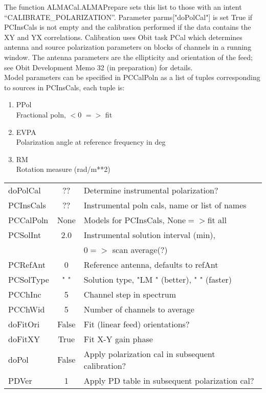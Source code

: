 \documentclass[11pt]{article}
\begin{document}
\begin{enumerate}
The function ALMACal.ALMAPrepare sets this list to those with an
intent ``CALIBRATE\_POLARIZATION''.
Parameter parms["doPolCal"] is set True if PCInsCals is not empty and
the calibration performed if the data contains the XY and YX
correlations. 
Calibration uses Obit task PCal which determines antenna and source
polarization parameters on blocks of channels in a running window.
The antenna parameters are the ellipticity and orientation of the
feed; see Obit Development Memo 32 (in preparation) for details.\\
Model parameters can be specified in PCCalPoln as a list of tuples
corresponding to sources in PCInsCals, each tuple is:
\begin{enumerate}
\item PPol\\
Fractional poln, $<$0 $=>$ fit
\item EVPA\\
Polarization angle at reference frequency in deg
\item RM\\
 Rotation measure (rad/m**2)
\end{enumerate}
\begin{center}
\begin{tabular}{|l|c|l|}
\hline
doPolCal  & ??     &  Determine instrumental polarization? \\
PCInsCals & ??     &  Instrumental poln cals, name or list of names\\
PCCalPoln &  None  &  Models for PCInsCals, None$=>$fit all \\
PCSolInt  & 2.0    &  Instrumental solution interval (min), \\
          &        & $0=>$ scan average(?) \\
PCRefAnt  & 0      &  Reference antenna, defaults to refAnt\\
PCSolType & "    " &  Solution type, "LM  " (better), "    " (faster)\\
PCChInc   & 5      &  Channel step in spectrum \\
PCChWid   & 5      &  Number of channels to average \\
doFitOri  &  False &  Fit (linear feed) orientations? \\
doFitXY   &  True  &  Fit X-Y gain phase\\
doPol     & False  &  Apply polarization cal in subsequent calibration?\\
PDVer     & 1      &  Apply PD table in subsequent polarization cal?\\

\end{tabular}
\end{center}
\end{enumerate}
\end{document}
